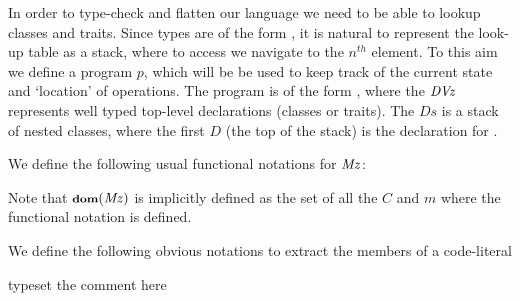 In order to type-check and flatten our language we need to be able to lookup classes and traits.
Since types
 are of the form ,
it is natural to represent the look-up table as a
stack, where to access  we
navigate to the $n^{th}$ element.
To this aim we define a program $p$, which will be be used to keep track of the current state and `location' of operations.
The program is of the form , where the $\mathit{DVz}$ represents well typed
top-level declarations (classes or traits). The $Ds$ is a stack of nested classes, where the first $D$ (the top of the stack) is the declaration for .


We define the following usual functional notations for  $\mathit{Mz}$:

\begin{defs}
\end{defs}
Note that ${\footnotesize{\textbf{dom}}({\mathit{Mz}})}$ is implicitly defined as the set of all the $C$ and $m$ where the functional notation is defined.

We define the following obvious notations to extract the members of a code-literal

\begin{defs}

typeset the comment here

\end{defs}

